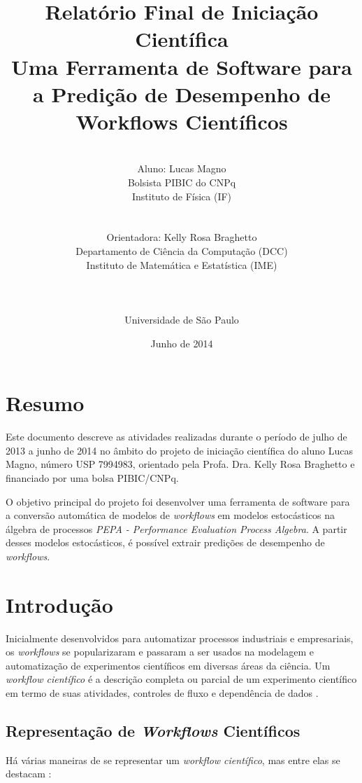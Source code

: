 \documentclass[a4paper,11pt]{article}
\date{\vfill Junho de 2014}
\title{
	Relatório Final de Iniciação Científica \vspace{40pt}\\ 
	Uma Ferramenta de Software para a Predição de Desempenho de Workflows Científicos
}
\author{
	\vspace{100pt}\\
	Aluno: Lucas Magno \\ 
	Bolsista PIBIC do CNPq \\
	Instituto de Física (IF) \\
	\\ \\
	Orientadora: Kelly Rosa Braghetto\\ 
	Departamento de Ciência da Computação (DCC) \\ 
	Instituto de Matemática e Estatística (IME) \\
	\\ \\ \\
	Universidade de São Paulo
}
\begin{document}
  \maketitle
  \thispagestyle{empty}
  \newpage
  \clearpage
  \setcounter{page}{1}
  \section*{Resumo}

    Este documento descreve as atividades realizadas durante o per\'iodo de julho de 2013 a junho de 2014 no \^ambito do projeto de iniciação científica do aluno Lucas Magno, n\'umero USP 7994983, orientado pela Profa. Dra. Kelly Rosa Braghetto e financiado por uma bolsa PIBIC/CNPq.

    O objetivo principal do projeto foi desenvolver uma ferramenta de software para a conversão autom\'atica de modelos de \emph{workflows} em modelos estocásticos na \'algebra de processos \emph{PEPA - Performance Evaluation Process Algebra}. A partir desses modelos estocásticos, \'e possível extrair prediç\~oes de desempenho de \emph{workflows}.
  \newpage
  \tableofcontents
  \newpage

  \section{Introdução}
  	Inicialmente desenvolvidos para automatizar processos industriais e empresariais, os \emph{workflows} se popularizaram e passaram a ser usados na modelagem e automatização de experimentos científicos em diversas áreas da ciência. Um \emph{workflow científico} é a descrição completa ou parcial de um experimento científico em termo de suas atividades, controles de fluxo e dependência de dados \cite{phd:gadelha12}. 

  	\subsection{Representação de \emph{Workflows} Científicos}
  	Há várias maneiras de se representar um \emph{workflow científico}, mas entre elas se destacam \cite{phd:oga11}:
\end{document}
